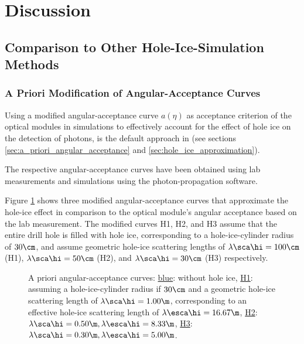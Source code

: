 
\section{Discussion}
\label{sec:discussion}

\subsection{Comparison to Other Hole-Ice-Simulation Methods}
\label{sec:comparison_methods}

\subsubsection{A Priori Modification of Angular-Acceptance Curves}
\label{sec:a_priori_modification_of_angular_acception_curves}\label{sec:a_priori_curve}


Using a modified angular-acceptance curve $a(\eta)$ as acceptance criterion of the optical modules in simulations to effectively account for the effect of hole ice on the detection of photons, is the default approach in \clsim (see sections \ref{sec:a_priori_angular_acceptance} and \ref{sec:hole_ice_approximation}).


The respective angular-acceptance curves have been obtained using lab measurements and simulations using the \photonics photon-propagation software. \cite{icepaper, lundberg, photonics}

Figure \ref{fig:Wee4ahYa} shows three modified angular-acceptance curves that approximate the hole-ice effect in comparison to the optical module's angular acceptance based on the lab measurement. The modified curves H1, H2, and H3 assume that the entire drill hole is filled with hole ice, corresponding to a hole-ice-cylinder radius of $30\cm$, and assume geometric hole-ice scattering lengths of $\lambda\sca\hi = 100\cm$ (H1), $\lambda\sca\hi = 50\cm$ (H2), and $\lambda\sca\hi = 30\cm$ (H3) respectively.

\begin{figure}[htbp]
  \caption{A priori angular-acceptance curves: \underline{blue}: without hole ice, \underline{H1}: assuming a hole-ice-cylinder radius if $30\cm$ and a geometric hole-ice scattering length of $\lambda\sca\hi = 1.00\m$, corresponding to an effective hole-ice scattering length of $\lambda\esca\hi = 16.67\m$, \underline{H2}: $\lambda\sca\hi = 0.50\m, \lambda\esca\hi = 8.33\m$, \underline{H3}: $\lambda\sca\hi = 0.30\m, \lambda\esca\hi = 5.00\m$. \cite{icepaper, yag, icemodelsdata}}
  \label{fig:Wee4ahYa}
\end{figure}

